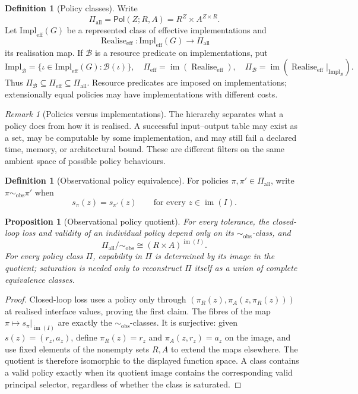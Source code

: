 \documentclass[11pt]{article}
\theoremstyle{plain}
\newtheorem{proposition}[theorem]{Proposition}
\theoremstyle{definition}
\newtheorem{definition}[theorem]{Definition}
\theoremstyle{remark}
\newtheorem{remark}[theorem]{Remark}
\newcommand{\im}{\operatorname{im}}
\newcommand{\Pol}{\mathsf{Pol}}
\newcommand{\realise}{\operatorname{Realise}}
\begin{document}
\begin{definition}[Policy classes]\label{def:realise}
Write
\[
\Pi_{\mathrm{all}}=\Pol(Z;R,A)=R^Z\times A^{Z\times R}.
\]
Let $\mathrm{Impl}_{\mathrm{eff}}(G)$ be a represented class of effective
implementations and
\[
\realise_{\mathrm{eff}}:\mathrm{Impl}_{\mathrm{eff}}(G)
\to\Pi_{\mathrm{all}}
\]
its realisation map. If $\mathcal B$ is a resource predicate on implementations,
put
\[
\mathrm{Impl}_{\mathcal B}
=\{\iota\in\mathrm{Impl}_{\mathrm{eff}}(G):\mathcal B(\iota)\},\quad
\Pi_{\mathrm{eff}}=\im(\realise_{\mathrm{eff}}),\quad
\Pi_{\mathcal B}=\im(\realise_{\mathrm{eff}}|_{\mathrm{Impl}_{\mathcal B}}).
\]
Thus $\Pi_{\mathcal B}\subseteq\Pi_{\mathrm{eff}}\subseteq\Pi_{\mathrm{all}}$.
Resource predicates are imposed on implementations; extensionally equal policies
may have implementations with different costs.
\end{definition}

\begin{remark}[Policies versus implementations]
The hierarchy separates what a policy does from how it is realised. A successful
input--output table may exist as a set, may be computable by some implementation,
and may still fail a declared time, memory, or architectural bound. These are
different filters on the same ambient space of possible policy behaviours.
\end{remark}



\begin{definition}[Observational policy equivalence]\label{def:gauge}
For policies $\pi,\pi'\in\Pi_{\mathrm{all}}$, write
$\pi\sim_{\mathrm{obs}}\pi'$ when
\[
s_\pi(z)=s_{\pi'}(z)\qquad\text{for every }z\in\im(I).
\]
\end{definition}

\begin{proposition}[Observational policy quotient]\label{prop:gauge}
For every tolerance, the closed-loop loss and validity of an individual policy
depend only on its $\sim_{\mathrm{obs}}$-class, and
\[
\Pi_{\mathrm{all}}/\!\sim_{\mathrm{obs}}
\cong (R\times A)^{\im(I)}.
\]
For every policy class $\Pi$, capability in $\Pi$ is determined by its image in
the quotient; saturation is needed only to reconstruct $\Pi$ itself as a union
of complete equivalence classes.
\end{proposition}

\begin{proof}
Closed-loop loss uses a policy only through
$(\pi_R(z),\pi_A(z,\pi_R(z)))$ at realised interface values, proving the first
claim. The fibres of the map
$\pi\mapsto s_\pi|_{\im(I)}$ are exactly the
$\sim_{\mathrm{obs}}$-classes. It is surjective: given
$s(z)=(r_z,a_z)$, define $\pi_R(z)=r_z$ and
$\pi_A(z,r_z)=a_z$ on the image, and use fixed elements of the nonempty sets
$R,A$ to extend the maps elsewhere. The quotient is therefore isomorphic to the
displayed function space. A class contains a valid policy exactly when its
quotient image contains the corresponding valid principal selector, regardless
of whether the class is saturated.
\end{proof}
\end{document}

